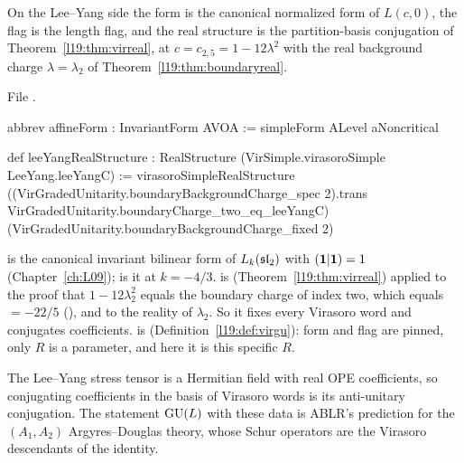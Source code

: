 \begin{definition}\label{l28:def:lydatum}
On the Lee--Yang side the form is the canonical normalized form  of $L(c,0)$, the flag is the length flag, and the real
structure is the partition-basis conjugation of Theorem~\ref{l19:thm:virreal}, at $c=c_{2,5}=1-12\lambda^2$ with the real background
charge $\lambda=\lambda_2$ of Theorem~\ref{l19:thm:boundaryreal}.
\end{definition}

\noindent File .
\begin{leancode}
abbrev affineForm : InvariantForm AVOA := simpleForm ALevel aNoncritical

def leeYangRealStructure : RealStructure (VirSimple.virasoroSimple LeeYang.leeYangC) :=
  virasoroSimpleRealStructure
    ((VirGradedUnitarity.boundaryBackgroundCharge_spec 2).trans
      VirGradedUnitarity.boundaryCharge_two_eq_leeYangC)
    (VirGradedUnitarity.boundaryBackgroundCharge_fixed 2)
\end{leancode}

\begin{dictionary}
 is the canonical invariant bilinear form of $L_k(\mathfrak{sl}_2)$ with $(\mathbf 1|\mathbf 1)=1$
(Chapter~\ref{ch:L09});  is it at $k=-4/3$.  is 
(Theorem~\ref{l19:thm:virreal}) applied to the proof that $1-12\lambda_2^2$ equals the boundary charge of index two, which equals
$=-22/5$ (), and to the reality of $\lambda_2$. So it fixes every Virasoro word
and conjugates coefficients.  is 
(Definition~\ref{l19:def:virgu}): form and flag are pinned, only $R$ is a parameter, and here it is this specific $R$.
\end{dictionary}

\begin{physics}
The Lee--Yang stress tensor is a Hermitian field with real OPE coefficients, so conjugating coefficients in the basis of Virasoro words
is its anti-unitary conjugation. The statement $\mathrm{GU}(L)$ with these data is ABLR's prediction for the $(A_1,A_2)$
Argyres--Douglas theory, whose Schur operators are the Virasoro descendants of the identity.
\end{physics}

